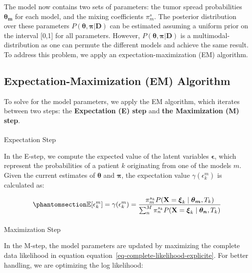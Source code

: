 \documentclass[
  sn-mathphys-num,
]{sn-jnl}
\makeatletter
\let\oldparagraph\paragraph
\renewcommand{\paragraph}{
    \@ifstar
      \xxxParagraphStar
      \xxxParagraphNoStar
  }
\newcommand{\xxxParagraphStar}[1]{\oldparagraph*{#1}\mbox{}}
\newcommand{\xxxParagraphNoStar}[1]{\oldparagraph{#1}\mbox{}}
\makeatother
\begin{document}
The model now contains two sets of parameters: the tumor spread
probabilities \(\mathbf{\theta_m}\) for each model, and the mixing
coefficients \(\pi_m^s\). The posterior distribution over these
parameters \(P(\boldsymbol{\theta},\boldsymbol{\pi}|\mathbf{D})\) can be
estimated assuming a uniform prior on the interval {[}0,1{]} for all
parameters. However,
\(P(\boldsymbol{\theta},\boldsymbol{\pi}|\mathbf{D})\) is a
multimodal-distribution as one can permute the different models and
achieve the same result. To address this problem, we apply an
expectation-maximization (EM) algorithm.

\subsection{Expectation-Maximization (EM)
Algorithm}\label{expectation-maximization-em-algorithm}

To solve for the model parameters, we apply the EM algorithm, which
iterates between two steps: the \textbf{Expectation (E) step} and
\textbf{the Maximization (M) step}.

\paragraph{Expectation Step}\label{expectation-step}

In the E-step, we compute the expected value of the latent variables
\(\boldsymbol{\epsilon}\), which represent the probabilities of a
patient \(k\) originating from one of the models \(m\). Given the
current estimates of \(\boldsymbol{\theta}\) and \(\boldsymbol{\pi}\),
the expectation value \(\gamma(\epsilon_k^m)\) is calculated as:

\begin{equation}\phantomsection\label{eq-expectation-step}{
\mathbb{E}[\epsilon^m_k] = \gamma(\epsilon^m_{k}) = \frac{\pi_m^{s_k} P(\mathbf{X} = \boldsymbol{\xi}_k \mid \boldsymbol{\theta_m}, T_k)}{\sum_{n}^M \pi_n^{s_k} P(\mathbf{X} = \boldsymbol{\xi}_k \mid \boldsymbol{\theta_n}, T_k)}
}\end{equation}

\paragraph{Maximization Step}\label{maximization-step}

In the M-step, the model parameters are updated by maximizing the
complete data likelihood in equation
equation~\ref{eq-complete-likelihood-explicite}. For better handling, we
are optimizing the log likelihood:
\end{document}
